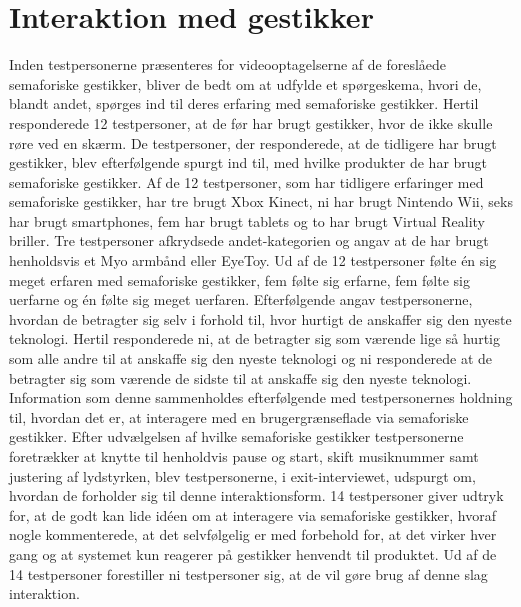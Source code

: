 \section{Interaktion med gestikker}
\label{TestresultaterInteraktioner}
%
Inden testpersonerne præsenteres for videooptagelserne af de foreslåede semaforiske gestikker, bliver de bedt om at udfylde et spørgeskema, hvori de, blandt andet, spørges ind til deres erfaring med semaforiske gestikker. Hertil responderede 12 testpersoner, at de før har brugt gestikker, hvor de ikke skulle røre ved en skærm. De testpersoner, der responderede, at de tidligere har brugt gestikker, blev efterfølgende spurgt ind til, med hvilke produkter de har brugt semaforiske gestikker. Af de 12 testpersoner, som har tidligere erfaringer med semaforiske gestikker, har tre brugt Xbox Kinect, ni har brugt Nintendo Wii, seks har brugt smartphones, fem har brugt tablets og to har brugt Virtual Reality briller. Tre testpersoner afkrydsede andet-kategorien og angav at de har brugt henholdsvis et Myo armbånd eller EyeToy. Ud af de 12 testpersoner følte én sig meget erfaren med semaforiske gestikker, fem følte sig erfarne, fem følte sig uerfarne og én følte sig meget uerfaren. Efterfølgende angav testpersonerne, hvordan de betragter sig selv i forhold til, hvor hurtigt de anskaffer sig den nyeste teknologi. Hertil responderede ni, at de betragter sig som værende lige så hurtig som alle andre til at anskaffe sig den nyeste teknologi og ni responderede at de betragter sig som værende de sidste til at anskaffe sig den nyeste teknologi. Information som denne sammenholdes efterfølgende med testpersonernes holdning til, hvordan det er, at interagere med en brugergrænseflade via semaforiske gestikker.\blankline
%
Efter udvælgelsen af hvilke semaforiske gestikker testpersonerne foretrækker at knytte til henholdvis pause og start, skift musiknummer samt justering af lydstyrken, blev testpersonerne, i exit-interviewet, udspurgt om, hvordan de forholder sig til denne interaktionsform. 14 testpersoner giver udtryk for, at de godt kan lide idéen om at interagere via semaforiske gestikker, hvoraf nogle kommenterede, at det selvfølgelig er med forbehold for, at det virker hver gang og at systemet kun reagerer på gestikker henvendt til produktet. Ud af de 14 testpersoner forestiller ni testpersoner sig, at de vil gøre brug af denne slag interaktion.

